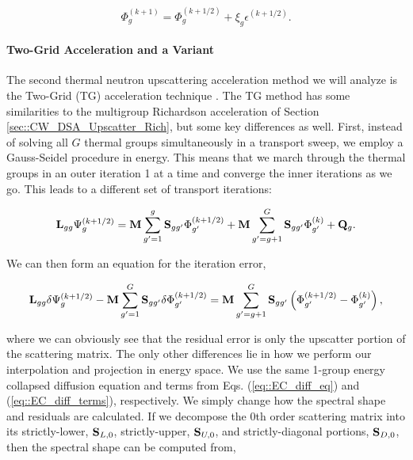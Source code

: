 \documentclass[11pt]{article}
\begin{document}
\begin{equation}
\label{eq::rich_update}
\Phi_g^{(k+1)} =  \Phi_g^{(k+1/2)} + \xi_g  \epsilon^{(k+1/2)}.
\end{equation}

\paragraph{Two-Grid Acceleration and a Variant}
\label{sec::CW_DSA_Upscatter_TG}

The second thermal neutron upscattering acceleration method we will analyze is the Two-Grid (TG) acceleration technique \cite{adams1993two}. The TG method has some similarities to the multigroup Richardson acceleration of Section \ref{sec::CW_DSA_Upscatter_Rich}, but some key differences as well. First, instead of solving all $G$ thermal groups simultaneously in a transport sweep, we employ a Gauss-Seidel procedure in energy. This means that we march through the thermal groups in an outer iteration 1 at a time and converge the inner iterations as we go. This leads to a different set of transport iterations:

\begin{equation}
\label{eq::GS_it}
{\bf L}_{gg} \Psi_g^{(k+1/2)} = {\bf M} \sum_{g'=1}^g {\bf S}_{g g'} \Phi_{g'}^{(k+1/2)} + {\bf M} \sum_{g'=g+1}^G {\bf S}_{g g'} \Phi_{g'}^{(k)} + {\bf Q}_g .
\end{equation}

We can then form an equation for the iteration error,

\begin{equation}
\label{eq::TG_full_eq_err}
{\bf L}_{gg} \delta \Psi_g^{(k+1/2)} - {\bf M} \sum_{g'=1}^G {\bf S}_{g g'} \delta \Phi_{g'}^{(k+1/2)}=  {\bf M} \sum_{g'=g+1}^G {\bf S}_{g g'}\left( \Phi_{g'}^{(k+1/2)}- \Phi_{g'}^{(k)} \right) ,
\end{equation}

\noindent where we can obviously see that the residual error is only the upscatter portion of the scattering matrix. The only other differences lie in how we perform our interpolation and projection in energy space. We use the same 1-group energy collapsed diffusion equation and terms from Eqs. (\ref{eq::EC_diff_eq}) and (\ref{eq::EC_diff_terms}), respectively. We simply change how the spectral shape and residuals are calculated. If we decompose the 0th order scattering matrix into its strictly-lower, ${\bf S}_{L,0}$, strictly-upper, ${\bf S}_{U,0}$, and strictly-diagonal portions, ${\bf S}_{D,0}$, then the spectral shape can be computed from,
\end{document}
